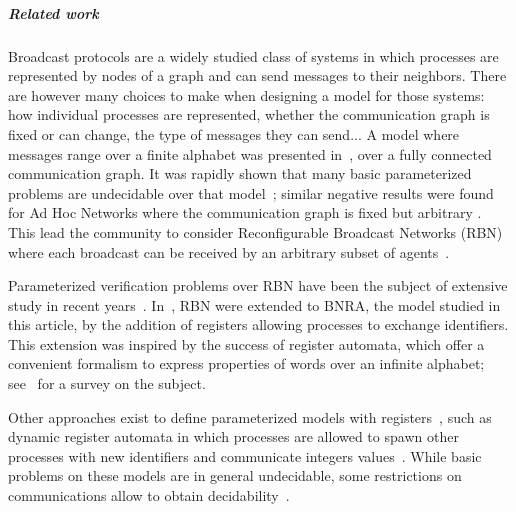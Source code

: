 \subparagraph*{Related work} 
Broadcast protocols are a widely studied class of systems in which processes are represented by nodes of a graph and can send messages to their neighbors. There are however many choices to make when designing a model for those systems: how individual processes are represented, whether the communication graph is fixed or can change, the type of messages they can send... 
A model where messages range over a finite alphabet was presented in~\cite{emerson1998model}, over a fully connected communication graph. It was rapidly shown that many basic parameterized problems are undecidable over that model~\cite{EsparzaFM1999verification}; similar negative results were found for Ad Hoc Networks where the communication graph is fixed but arbitrary \cite{DBLP:conf/concur/DelzannoSZ10}. This lead the community to consider Reconfigurable Broadcast Networks (RBN) where each broadcast can be received by an arbitrary subset of agents~\cite{DelzannoSZ2010Adhoc}.

Parameterized verification problems over RBN have been the subject of extensive study in recent years~\cite{DelzannoSTZ12, Balasubramanian18, BalasubramanianGW22, DBLP:journals/computing/ChiniMS22}. In~\cite{DelzannoST13}, RBN were extended to BNRA, the model studied in this article, by the addition of registers allowing processes to exchange identifiers. This extension was inspired by the success of register automata, which offer a convenient formalism to express properties of words over an infinite alphabet; see~\cite{Segoufin06} for a survey on the subject.

Other approaches exist to define parameterized models with registers~\cite{BolligRS21}, such as dynamic register automata in which processes are allowed to spawn other processes with new identifiers and communicate integers values~\cite{AbdullaAKR14}. While basic problems on these models are in general undecidable, some restrictions on communications allow to obtain decidability~\cite{AbdullaAKR15, Rezine17}.

